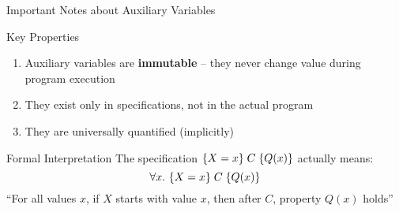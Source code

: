 \begin{frame}{Important Notes about Auxiliary Variables}
    \begin{alertblock}{Key Properties}
        \begin{enumerate}
            \item Auxiliary variables are \textbf{immutable} -- they never change value during program execution
            \item They exist only in specifications, not in the actual program
            \item They are universally quantified (implicitly)
        \end{enumerate}
    \end{alertblock}
    
    \begin{block}{Formal Interpretation}
        The specification $\{X=x\}\; C\; \{Q(x)\}$ actually means:
        \[\forall x.\ \{X=x\}\; C\; \{Q(x)\}\]
        ``For all values $x$, if $X$ starts with value $x$, then after $C$, property $Q(x)$ holds''
    \end{block}
\end{frame}